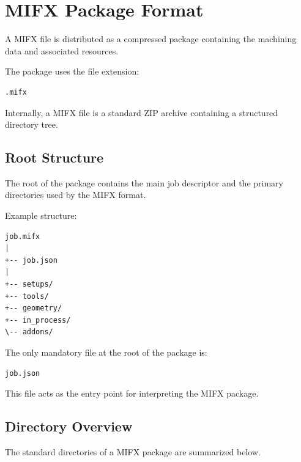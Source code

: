 \section{MIFX Package Format}

A MIFX file is distributed as a compressed package containing the machining data and associated resources.

The package uses the file extension:

\begin{verbatim}
.mifx
\end{verbatim}

Internally, a MIFX file is a standard ZIP archive containing a structured directory tree.

\subsection{Root Structure}

The root of the package contains the main job descriptor and the primary directories used by the MIFX format.

Example structure:

\begin{verbatim}
job.mifx
|
+-- job.json
|
+-- setups/
+-- tools/
+-- geometry/
+-- in_process/
\-- addons/
\end{verbatim}

The only mandatory file at the root of the package is:

\begin{verbatim}
job.json
\end{verbatim}

This file acts as the entry point for interpreting the MIFX package.

\subsection{Directory Overview}

The standard directories of a MIFX package are summarized below.

